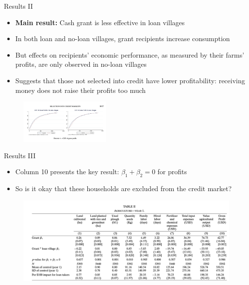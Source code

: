 \documentclass[11pt,notes=hide,aspectratio=169,mathserif]{beamer}
\begin{document}
\begin{frame}{Results II}
\begin{itemize}
    \item \textbf{Main result:} Cash grant is less effective in loan villages
    \item In both loan and no-loan villages, grant recipients increase consumption
    \item But effects on recipients' economic performance, as measured by their farms' profits, are only observed in no-loan villages
    \item Suggests that those not selected into credit have lower profitability: receiving money does not raise their profits too much
\end{itemize}
\begin{figure}
    \centering
    \includegraphics[width=0.4\textwidth]{inputs/fig5.png}
\end{figure}
\end{frame}

\begin{frame}{Results III}
\begin{itemize}
    \item Column 10 presents the key result: $\beta_1+\beta_2 = 0$  for profits
    \item So is it okay that these households are excluded from the credit market? 
\end{itemize}
\begin{figure}
        \centering
        \includegraphics[width=\textwidth]{inputs/fig6.png}
\end{figure}
\end{frame}
\end{document}

